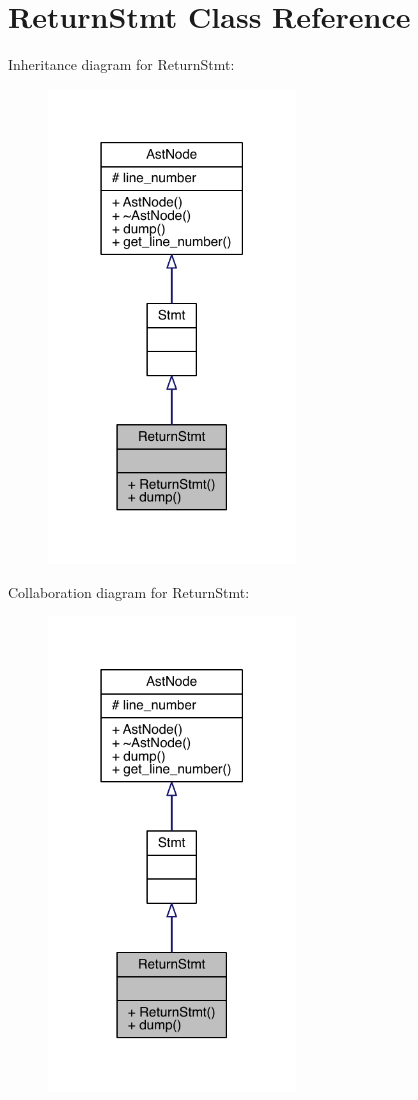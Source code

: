 \hypertarget{class_return_stmt}{}\section{Return\+Stmt Class Reference}
\label{class_return_stmt}


Inheritance diagram for Return\+Stmt\+:\nopagebreak
\begin{figure}[H]
\begin{center}
\leavevmode
\includegraphics[width=186pt]{class_return_stmt__inherit__graph}
\end{center}
\end{figure}


Collaboration diagram for Return\+Stmt\+:\nopagebreak
\begin{figure}[H]
\begin{center}
\leavevmode
\includegraphics[width=186pt]{class_return_stmt__coll__graph}
\end{center}
\end{figure}
